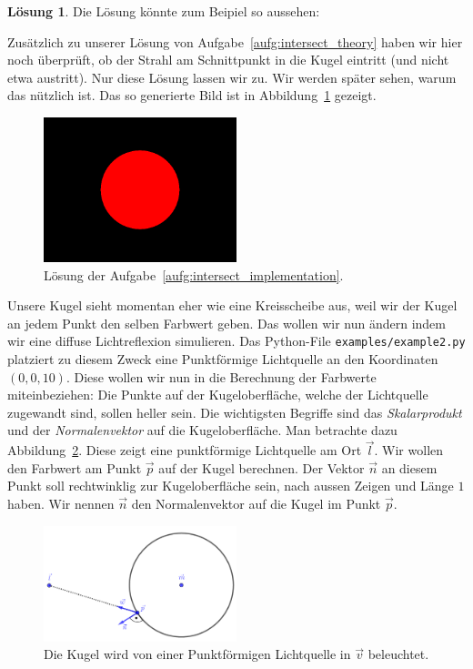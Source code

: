 \documentclass[12pt,a4paper]{article}
\theoremstyle{definition}
\theoremstyle{definition}
\newtheorem*{losung*}{Lösung}
\begin{document}
\begin{losung*}
	Die Lösung könnte zum Beipiel so aussehen:
	
	Zusätzlich zu unserer Lösung von Aufgabe~\ref{aufg:intersect_theory} haben wir hier noch überprüft, ob der Strahl am Schnittpunkt in die Kugel eintritt (und nicht etwa austritt).
	Nur diese Lösung lassen wir zu.
	Wir werden später sehen, warum das nützlich ist.
	Das so generierte Bild ist in Abbildung~\ref{fig:solution_sphere} gezeigt.
	\begin{figure}[ht]
		\centering
		\includegraphics[width=0.5\textwidth]{images/example1.png}
		\caption{Lösung der Aufgabe~\ref{aufg:intersect_implementation}.}
		\label{fig:solution_sphere}
	\end{figure}
\end{losung*}
Unsere Kugel sieht momentan eher wie eine Kreisscheibe aus, weil wir der Kugel an jedem Punkt den selben Farbwert geben.
Das wollen wir nun ändern indem wir eine diffuse Lichtreflexion simulieren.
Das Python-File \texttt{examples/example2.py} platziert zu diesem Zweck eine Punktförmige Lichtquelle an den Koordinaten $(0,0,10)$.
Diese wollen wir nun in die Berechnung der Farbwerte miteinbeziehen:
Die Punkte auf der Kugeloberfläche, welche der Lichtquelle zugewandt sind, sollen heller sein.
Die wichtigsten Begriffe sind das \textit{Skalarprodukt} und der \textit{Normalenvektor} auf die Kugeloberfläche.
Man betrachte dazu Abbildung~\ref{fig:sphere_diffuse}.
Diese zeigt eine punktförmige Lichtquelle am Ort $\vec{l}$.
Wir wollen den Farbwert am Punkt $\vec{p}$ auf der Kugel berechnen.
Der Vektor $\vec{n}$ an diesem Punkt soll rechtwinklig zur Kugeloberfläche sein, nach aussen Zeigen und Länge $1$ haben.
Wir nennen $\vec{n}$ den Normalenvektor auf die Kugel im Punkt $\vec{p}$.
\begin{figure}[ht]
	\centering
	\includegraphics[width=0.5\textwidth]{images/sphere_diffuse.pdf}
	\caption{Die Kugel wird von einer Punktförmigen Lichtquelle in $\vec{v}$ beleuchtet.}
\label{fig:sphere_diffuse}
\end{figure}
\end{document}
